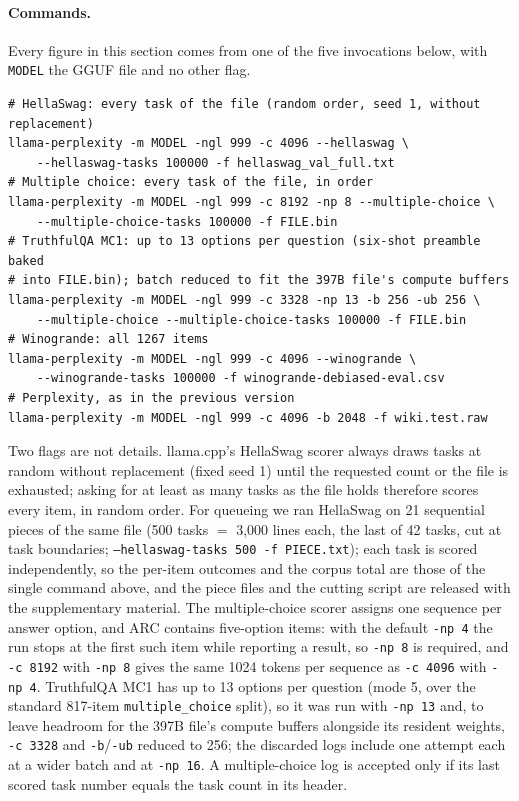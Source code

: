 \documentclass[10pt]{article} %
\begin{document}
\paragraph{Commands.} Every figure in this section comes from one of the five
invocations below, with \texttt{MODEL} the GGUF file and no other flag.
{\small
\begin{verbatim}
# HellaSwag: every task of the file (random order, seed 1, without replacement)
llama-perplexity -m MODEL -ngl 999 -c 4096 --hellaswag \
    --hellaswag-tasks 100000 -f hellaswag_val_full.txt
# Multiple choice: every task of the file, in order
llama-perplexity -m MODEL -ngl 999 -c 8192 -np 8 --multiple-choice \
    --multiple-choice-tasks 100000 -f FILE.bin
# TruthfulQA MC1: up to 13 options per question (six-shot preamble baked
# into FILE.bin); batch reduced to fit the 397B file's compute buffers
llama-perplexity -m MODEL -ngl 999 -c 3328 -np 13 -b 256 -ub 256 \
    --multiple-choice --multiple-choice-tasks 100000 -f FILE.bin
# Winogrande: all 1267 items
llama-perplexity -m MODEL -ngl 999 -c 4096 --winogrande \
    --winogrande-tasks 100000 -f winogrande-debiased-eval.csv
# Perplexity, as in the previous version
llama-perplexity -m MODEL -ngl 999 -c 4096 -b 2048 -f wiki.test.raw
\end{verbatim}}
Two flags are not details. llama.cpp's HellaSwag scorer always draws tasks at
random without replacement (fixed seed 1) until the requested count or the
file is exhausted; asking for at least as many tasks as the file holds
therefore scores every item, in random order. For queueing we ran HellaSwag
on 21 sequential pieces of the same file (500 tasks $=$ 3,000 lines each, the
last of 42 tasks, cut at task boundaries; \texttt{--hellaswag-tasks 500 -f
PIECE.txt}); each task is scored independently, so the per-item outcomes and
the corpus total are those of the single command above, and the piece files
and the cutting script are released with the supplementary material. The multiple-choice scorer
assigns one sequence per answer option, and ARC contains five-option items:
with the default \texttt{-np 4} the run stops at the first such item while
reporting a result, so \texttt{-np 8} is required, and \texttt{-c 8192} with
\texttt{-np 8} gives the same 1024 tokens per sequence as \texttt{-c 4096}
with \texttt{-np 4}. TruthfulQA MC1 has up to 13 options per question (mode
5, over the standard 817-item \texttt{multiple\_choice} split), so it was run
with \texttt{-np 13} and, to leave headroom for the 397B file's compute
buffers alongside its resident weights, \texttt{-c 3328} and \texttt{-b}/\texttt{-ub}
reduced to 256; the discarded logs include one attempt each at a wider batch
and at \texttt{-np 16}. A multiple-choice log is accepted only if its last scored
task number equals the task count in its header.
\end{document}
